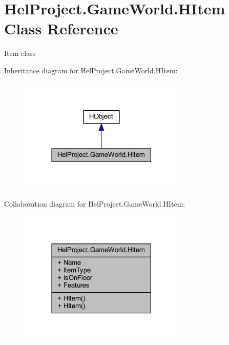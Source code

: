 \hypertarget{class_hel_project_1_1_game_world_1_1_h_item}{}\section{Hel\+Project.\+Game\+World.\+H\+Item Class Reference}
\label{class_hel_project_1_1_game_world_1_1_h_item}


Item class  




Inheritance diagram for Hel\+Project.\+Game\+World.\+H\+Item\+:
\nopagebreak
\begin{figure}[H]
\begin{center}
\leavevmode
\includegraphics[width=225pt]{class_hel_project_1_1_game_world_1_1_h_item__inherit__graph}
\end{center}
\end{figure}


Collaboration diagram for Hel\+Project.\+Game\+World.\+H\+Item\+:
\nopagebreak
\begin{figure}[H]
\begin{center}
\leavevmode
\includegraphics[width=225pt]{class_hel_project_1_1_game_world_1_1_h_item__coll__graph}
\end{center}
\end{figure}
